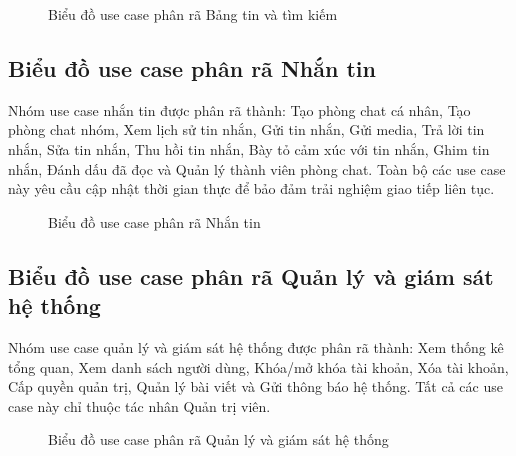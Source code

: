 \documentclass[../DoAn.tex]{subfiles}
\begin{document}
\begin{figure}[H]
\centering
{}
\caption{Biểu đồ use case phân rã Bảng tin và tìm kiếm}
\label{fig:use-case-feed-search}
\end{figure}

\subsection{Biểu đồ use case phân rã Nhắn tin}
\label{subsection:2.2.6}
Nhóm use case nhắn tin được phân rã thành: Tạo phòng chat cá nhân, Tạo phòng chat nhóm, Xem lịch sử tin nhắn, Gửi tin nhắn, Gửi media, Trả lời tin nhắn, Sửa tin nhắn, Thu hồi tin nhắn, Bày tỏ cảm xúc với tin nhắn, Ghim tin nhắn, Đánh dấu đã đọc và Quản lý thành viên phòng chat. Toàn bộ các use case này yêu cầu cập nhật thời gian thực để bảo đảm trải nghiệm giao tiếp liên tục.

\begin{figure}[H]
\centering
{}
\caption{Biểu đồ use case phân rã Nhắn tin}
\label{fig:use-case-chat}
\end{figure}

\subsection{Biểu đồ use case phân rã Quản lý và giám sát hệ thống}
\label{subsection:2.2.7}
Nhóm use case quản lý và giám sát hệ thống được phân rã thành: Xem thống kê tổng quan, Xem danh sách người dùng, Khóa/mở khóa tài khoản, Xóa tài khoản, Cấp quyền quản trị, Quản lý bài viết và Gửi thông báo hệ thống. Tất cả các use case này chỉ thuộc tác nhân Quản trị viên.

\begin{figure}[H]
\centering
{}
\caption{Biểu đồ use case phân rã Quản lý và giám sát hệ thống}
\label{fig:use-case-admin-manage}
\end{figure}
\end{document}
